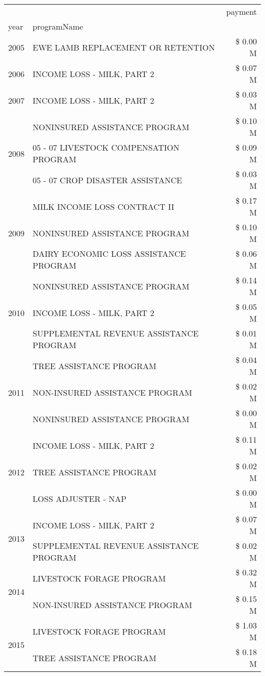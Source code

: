 \begin{tabular}{llr}
\toprule
 &  & payment \\
year & programName &  \\
\midrule
2005 & EWE LAMB REPLACEMENT OR RETENTION & \$ 0.00 M \\
\cline{1-3}
2006 & INCOME LOSS - MILK, PART 2 & \$ 0.07 M \\
\cline{1-3}
2007 & INCOME LOSS - MILK, PART 2 & \$ 0.03 M \\
\cline{1-3}
\multirow[t]{3}{*}{2008} & NONINSURED ASSISTANCE PROGRAM & \$ 0.10 M \\
 & 05 - 07 LIVESTOCK COMPENSATION PROGRAM & \$ 0.09 M \\
 & 05 - 07 CROP DISASTER ASSISTANCE & \$ 0.03 M \\
\cline{1-3}
\multirow[t]{3}{*}{2009} & MILK INCOME LOSS CONTRACT II & \$ 0.17 M \\
 & NONINSURED ASSISTANCE PROGRAM & \$ 0.10 M \\
 & DAIRY ECONOMIC LOSS ASSISTANCE PROGRAM & \$ 0.06 M \\
\cline{1-3}
\multirow[t]{3}{*}{2010} & NONINSURED ASSISTANCE PROGRAM & \$ 0.14 M \\
 & INCOME LOSS - MILK, PART 2 & \$ 0.05 M \\
 & SUPPLEMENTAL REVENUE ASSISTANCE PROGRAM & \$ 0.01 M \\
\cline{1-3}
\multirow[t]{3}{*}{2011} & TREE ASSISTANCE PROGRAM & \$ 0.04 M \\
 & NON-INSURED ASSISTANCE PROGRAM & \$ 0.02 M \\
 & NONINSURED ASSISTANCE PROGRAM & \$ 0.00 M \\
\cline{1-3}
\multirow[t]{3}{*}{2012} & INCOME LOSS - MILK, PART 2 & \$ 0.11 M \\
 & TREE ASSISTANCE PROGRAM & \$ 0.02 M \\
 & LOSS ADJUSTER - NAP & \$ 0.00 M \\
\cline{1-3}
\multirow[t]{2}{*}{2013} & INCOME LOSS - MILK, PART 2 & \$ 0.07 M \\
 & SUPPLEMENTAL REVENUE ASSISTANCE PROGRAM & \$ 0.02 M \\
\cline{1-3}
\multirow[t]{2}{*}{2014} & LIVESTOCK FORAGE PROGRAM & \$ 0.32 M \\
 & NON-INSURED ASSISTANCE PROGRAM & \$ 0.15 M \\
\cline{1-3}
\multirow[t]{3}{*}{2015} & LIVESTOCK FORAGE PROGRAM & \$ 1.03 M \\
 & TREE ASSISTANCE PROGRAM & \$ 0.18 M \\

\end{tabular}
